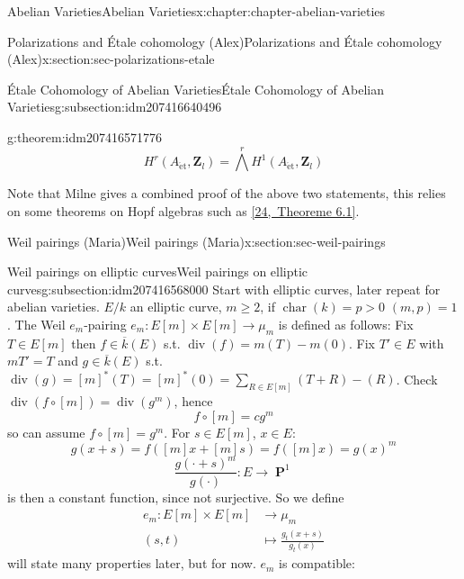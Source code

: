 \documentclass[oneside,10pt,]{book}
\numberwithin{equation}{section}
\newcommand{\lb}{[}
\newcommand{\rb}{]}
\newcommand{\ZZ}{\mathbf{Z}}
\newcommand{\et}{\mathrm{\acute{e}t}}
\DeclareMathOperator{\divisor}{div}
\DeclareMathOperator{\characteristic}{char}
\DeclareMathOperator{\PP}{\mathbf{P}}
\newcommand{\gt}{>}
\newcommand{\amp}{&}
\begin{document}
\begin{chapterptx}{Abelian Varieties}{}{Abelian Varieties}{}{}{x:chapter:chapter-abelian-varieties}
\begin{sectionptx}{Polarizations and Étale cohomology (Alex)}{}{Polarizations and Étale cohomology (Alex)}{}{}{x:section:sec-polarizations-etale}
\begin{subsectionptx}{Étale Cohomology of Abelian Varieties}{}{Étale Cohomology of Abelian Varieties}{}{}{g:subsection:idm207416640496}
\begin{theorem}{}{}{g:theorem:idm207416571776}
%
\begin{equation*}
H^r(A_\et, \ZZ_l) = \bigwedge^r H^1(A_\et, \ZZ_l)
\end{equation*}
%
\end{theorem}
Note that Milne gives a combined proof of the above two statements, this relies on some theorems on Hopf algebras such as \hyperlink{x:biblio:bib-borel-hopf}{[24,~Theoreme 6.1]}.%
\end{subsectionptx}
\end{sectionptx}
%
%
\typeout{************************************************}
\typeout{************************************************}
%
\begin{sectionptx}{Weil pairings (Maria)}{}{Weil pairings (Maria)}{}{}{x:section:sec-weil-pairings}
%
%
\typeout{************************************************}
\typeout{************************************************}
%
\begin{subsectionptx}{Weil pairings on elliptic curves}{}{Weil pairings on elliptic curves}{}{}{g:subsection:idm207416568000}
Start with elliptic curves, later repeat for abelian varieties. \(E/k\) an elliptic curve, \(m\ge 2\), if \(\characteristic(k) = p \gt 0\) \((m,p) = 1\). The Weil \(e_m\)-pairing \(e_m \colon E\lb m\rb \times E\lb m \rb \to \mu_m\) is defined as follows: Fix \(T\in E\lb m \rb\) then \(f\in \overline  k (E)\) s.t. \(\divisor(f) = m(T) - m(0)\). Fix \(T' \in E\) with \(mT' = T\) and \(g\in \overline k(E)\) s.t. \(\divisor(g) = \lb m \rb^*(T) = \lb m \rb^*(0)= \sum_{R\in E\lb m \rb} (T+R) - (R)\). Check \(\divisor (f\circ \lb m \rb) = \divisor(g^m)\), hence%
\begin{equation*}
f\circ [m] = c g^m
\end{equation*}
so can assume \(f\circ \lb m \rb = g^m\). For \(s \in E\lb m \rb\), \(x\in E\):%
\begin{equation*}
g(x + s) = f([m]x + [m]s) = f([m]x) = g(x)^m
\end{equation*}
%
\begin{equation*}
\frac{g(\cdot + s)^m}{g(\cdot)} \colon E \to \PP^1
\end{equation*}
is then a constant function, since not surjective. So we define%
\begin{align*}
e_m\colon E[m]\times E[m] \amp\to \mu_m\\
(s,t)\amp \mapsto \frac{g_t(x+s)}{g_t(x)}
\end{align*}
will state many properties later, but for now. \(e_m\) is compatible:%

\end{subsectionptx}
\end{sectionptx}
\end{chapterptx}
\end{document}
